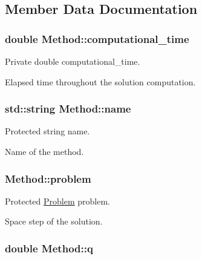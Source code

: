 \subsection{Member Data Documentation}
\subsubsection[{\texorpdfstring{computational\+\_\+time}{computational_time}}]{\setlength{\rightskip}{0pt plus 5cm}double Method\+::computational\+\_\+time\hspace{0.3cm}{\ttfamily [private]}}\hypertarget{classMethod_a4504c8cdb13651c87485d76d6e20d7ef}{}\label{classMethod_a4504c8cdb13651c87485d76d6e20d7ef}


Private double computational\+\_\+time. 

Elapsed time throughout the solution computation. 
\subsubsection[{\texorpdfstring{name}{name}}]{\setlength{\rightskip}{0pt plus 5cm}std\+::string Method\+::name\hspace{0.3cm}{\ttfamily [protected]}}\hypertarget{classMethod_a8648aeee4e6ebb1adc52522ac26ac523}{}\label{classMethod_a8648aeee4e6ebb1adc52522ac26ac523}


Protected string name. 

Name of the method. 
\subsubsection[{\texorpdfstring{problem}{problem}}]{ Method\+::problem\hspace{0.3cm}{\ttfamily [protected]}}\hypertarget{classMethod_a29a08a679b5d30a8c813766308205041}{}\label{classMethod_a29a08a679b5d30a8c813766308205041}


Protected \hyperlink{classProblem}{Problem} problem. 

Space step of the solution. 
\subsubsection[{\texorpdfstring{q}{q}}]{\setlength{\rightskip}{0pt plus 5cm}double Method\+::q\hspace{0.3cm}{\ttfamily [protected]}}\hypertarget{classMethod_a794257d62bedf3691c3c0a2b921b8886}{}\label{classMethod_a794257d62bedf3691c3c0a2b921b8886}


